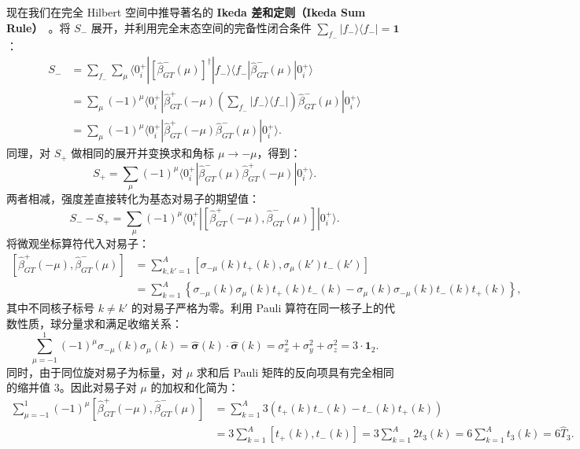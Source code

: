 现在我们在完全 Hilbert 空间中推导著名的 \textbf{Ikeda 差和定则（Ikeda Sum Rule）}~\cite{book-suhonen-from-nucleons-to-nucleus}。将 $S_-$ 展开，并利用完全末态空间的完备性闭合条件 $\sum_{f_-} |f_-\rangle \langle f_-| = \mathbf{1}$：
\begin{align}\label{eq:2-7-Sminus-derivation}
S_- &= \sum_{f_-} \sum_\mu \langle 0^+_i | [\hat{\beta}^-_{GT}(\mu)]^\dagger | f_-\rangle \langle f_- | \hat{\beta}^-_{GT}(\mu) | 0^+_i \rangle \nonumber\\
&= \sum_\mu (-1)^\mu \langle 0^+_i | \hat{\beta}^+_{GT}(-\mu) \left( \sum_{f_-} |f_-\rangle \langle f_-| \right) \hat{\beta}^-_{GT}(\mu) | 0^+_i \rangle \nonumber\\
&= \sum_\mu (-1)^\mu \langle 0^+_i | \hat{\beta}^+_{GT}(-\mu) \hat{\beta}^-_{GT}(\mu) | 0^+_i \rangle.
\end{align}
同理，对 $S_+$ 做相同的展开并变换求和角标 $\mu \to -\mu$，得到：
\begin{equation}\label{eq:2-7-Splus-derivation}
S_+ = \sum_\mu (-1)^\mu \langle 0^+_i | \hat{\beta}^-_{GT}(\mu) \hat{\beta}^+_{GT}(-\mu) | 0^+_i \rangle.
\end{equation}
两者相减，强度差直接转化为基态对易子的期望值：
\begin{equation}\label{eq:2-7-diff-commutator}
S_- - S_+ = \sum_\mu (-1)^\mu \langle 0^+_i | \left[ \hat{\beta}^+_{GT}(-\mu), \hat{\beta}^-_{GT}(\mu) \right] | 0^+_i \rangle.
\end{equation}
将微观坐标算符代入对易子：
\begin{align}\label{eq:2-7-commutator-eval}
\left[ \hat{\beta}^+_{GT}(-\mu), \hat{\beta}^-_{GT}(\mu) \right] &= \sum_{k, k'=1}^A \left[ \sigma_{-\mu}(k) t_+(k), \sigma_\mu(k') t_-(k') \right] \nonumber\\
&= \sum_{k=1}^A \left\{ \sigma_{-\mu}(k) \sigma_\mu(k) t_+(k) t_-(k) - \sigma_\mu(k) \sigma_{-\mu}(k) t_-(k) t_+(k) \right\},
\end{align}
其中不同核子标号 $k \ne k'$ 的对易子严格为零。利用 Pauli 算符在同一核子上的代数性质，球分量求和满足收缩关系：
\begin{equation}\label{eq:2-7-pauli-contraction}
\sum_{\mu=-1}^1 (-1)^\mu \sigma_{-\mu}(k) \sigma_\mu(k) = \hat{\boldsymbol{\sigma}}(k) \cdot \hat{\boldsymbol{\sigma}}(k) = \sigma_x^2 + \sigma_y^2 + \sigma_z^2 = 3 \cdot \mathbf{1}_2.
\end{equation}
同时，由于同位旋对易子为标量，对 $\mu$ 求和后 Pauli 矩阵的反向项具有完全相同的缩并值 3。因此对易子对 $\mu$ 的加权和化简为：
\begin{align}\label{eq:2-7-commutator-final}
\sum_{\mu=-1}^1 (-1)^\mu \left[ \hat{\beta}^+_{GT}(-\mu), \hat{\beta}^-_{GT}(\mu) \right] &= \sum_{k=1}^A 3 \left( t_+(k) t_-(k) - t_-(k) t_+(k) \right) \nonumber\\
&= 3 \sum_{k=1}^A [t_+(k), t_-(k)] = 3 \sum_{k=1}^A 2 t_3(k) = 6 \sum_{k=1}^A t_3(k) = 6 \hat{T}_3.
\end{align}
